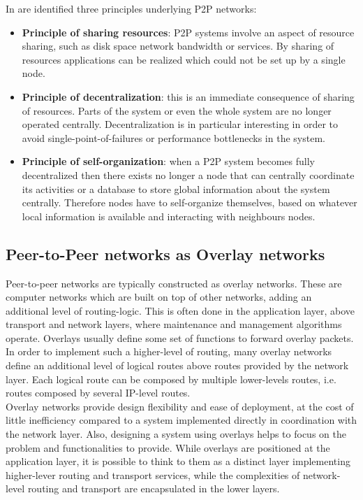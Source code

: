In \cite{Aberer02anoverview} are identified three principles underlying P2P networks:
\begin{itemize}
\item  \textbf{Principle of sharing resources}: P2P systems involve an aspect of resource sharing, such as disk space network bandwidth or services. By sharing of resources applications can be realized which could not be set up by a single node.
\item \textbf{Principle of decentralization}: this is an immediate consequence of sharing of resources. Parts of the system or even the whole system are no longer operated centrally. Decentralization is in particular interesting in order to avoid single-point-of-failures or performance bottlenecks in the system.
\item \textbf{Principle of self-organization}: when a P2P system becomes fully decentralized then there exists no longer a node that can centrally coordinate its activities or a database to store global information about the system centrally. Therefore nodes have to self-organize themselves, based on whatever local information is available and interacting with neighbours nodes.
\end{itemize}




\subsection{Peer-to-Peer networks as Overlay networks}
Peer-to-peer networks are typically constructed as overlay networks. These are computer networks which are built on top of other networks, adding an additional level of routing-logic. This is often done in the application layer, above transport and network layers, where maintenance and management algorithms operate. Overlays usually define some set of functions to forward overlay packets. In order to implement such a higher-level of routing, many overlay networks define an additional level of logical routes above routes provided by the network layer. Each logical route can be composed by multiple lower-levels routes, i.e. routes composed by several IP-level routes.
\\

Overlay networks provide design flexibility and ease of deployment, at the cost of little inefficiency compared to a system implemented directly in coordination with the network layer. Also, designing a system using overlays helps to focus on the problem and functionalities to provide. While overlays are positioned at the application layer, it is possible to think to them as a distinct layer implementing higher-lever routing and transport services, while the complexities of network-level routing and transport are encapsulated in the lower layers.
\\

